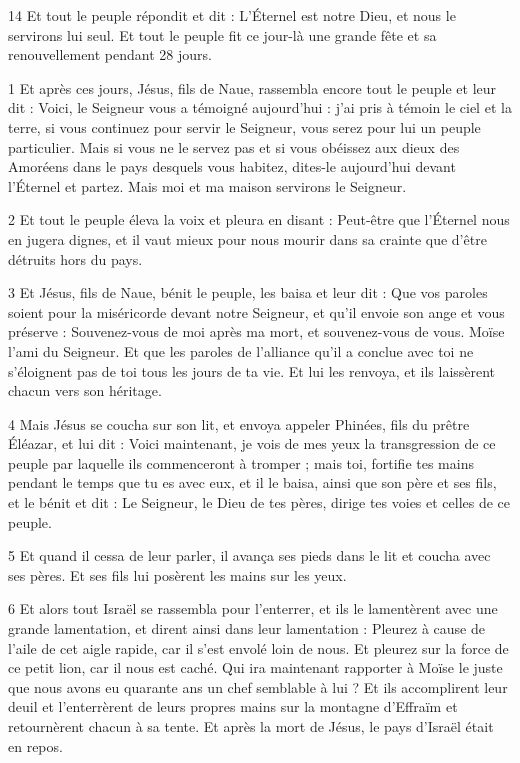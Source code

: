 \par 14 Et tout le peuple répondit et dit : L'Éternel est notre Dieu, et nous le servirons lui seul. Et tout le peuple fit ce jour-là une grande fête et sa renouvellement pendant 28 jours.


\par 1 Et après ces jours, Jésus, fils de Naue, rassembla encore tout le peuple et leur dit : Voici, le Seigneur vous a témoigné aujourd'hui : j'ai pris à témoin le ciel et la terre, si vous continuez pour servir le Seigneur, vous serez pour lui un peuple particulier. Mais si vous ne le servez pas et si vous obéissez aux dieux des Amoréens dans le pays desquels vous habitez, dites-le aujourd'hui devant l'Éternel et partez. Mais moi et ma maison servirons le Seigneur.

\par 2 Et tout le peuple éleva la voix et pleura en disant : Peut-être que l'Éternel nous en jugera dignes, et il vaut mieux pour nous mourir dans sa crainte que d'être détruits hors du pays.

\par 3 Et Jésus, fils de Naue, bénit le peuple, les baisa et leur dit : Que vos paroles soient pour la miséricorde devant notre Seigneur, et qu'il envoie son ange et vous préserve : Souvenez-vous de moi après ma mort, et souvenez-vous de vous. Moïse l'ami du Seigneur. Et que les paroles de l'alliance qu'il a conclue avec toi ne s'éloignent pas de toi tous les jours de ta vie. Et lui les renvoya, et ils laissèrent chacun vers son héritage.

\par 4 Mais Jésus se coucha sur son lit, et envoya appeler Phinées, fils du prêtre Éléazar, et lui dit : Voici maintenant, je vois de mes yeux la transgression de ce peuple par laquelle ils commenceront à tromper ; mais toi, fortifie tes mains pendant le temps que tu es avec eux, et il le baisa, ainsi que son père et ses fils, et le bénit et dit : Le Seigneur, le Dieu de tes pères, dirige tes voies et celles de ce peuple.

\par 5 Et quand il cessa de leur parler, il avança ses pieds dans le lit et coucha avec ses pères. Et ses fils lui posèrent les mains sur les yeux.

\par 6 Et alors tout Israël se rassembla pour l'enterrer, et ils le lamentèrent avec une grande lamentation, et dirent ainsi dans leur lamentation : Pleurez à cause de l'aile de cet aigle rapide, car il s'est envolé loin de nous. Et pleurez sur la force de ce petit lion, car il nous est caché. Qui ira maintenant rapporter à Moïse le juste que nous avons eu quarante ans un chef semblable à lui ? Et ils accomplirent leur deuil et l'enterrèrent de leurs propres mains sur la montagne d'Effraïm et retournèrent chacun à sa tente. Et après la mort de Jésus, le pays d'Israël était en repos.

